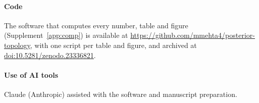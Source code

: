\paragraph{Code} The software that computes every number, table and figure (Supplement~\ref{app:comp}) is available at
\url{https://github.com/mmehta4/posterior-topology}, with one script per table and figure, and archived at
\href{https://doi.org/10.5281/zenodo.23336821}{doi:10.5281/zenodo.23336821}.

\paragraph{Use of AI tools} Claude (Anthropic) assisted with the software and manuscript preparation.


